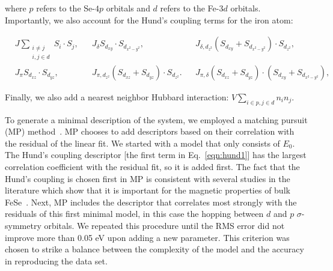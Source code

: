 where $p$ refers to the Se-$4p$ orbitals and $d$ refers to the Fe-$3d$ orbitals. 
Importantly, we also account for the Hund's coupling terms for the iron atom:

\begin{align}
  &J \sum_{\substack{i\ne j \\i,j \in d}} S_i \cdot S_j,&
  &J_{\delta} S_{d_{xy}} \cdot S_{d_{x^2-y^2}},&
  &J_{\delta,d_{z^2}} (S_{d_{xy}} + S_{d_{x^2-y^2}}) \cdot S_{d_{z^2}},& \label{eqn:hund1}
  \nonumber \\
  &J_{\pi} S_{d_{xz}} \cdot S_{d_{yz}},&
  &J_{\pi,d_{z^2}} (S_{d_{xz}} + S_{d_{yz}}) \cdot S_{d_{z^2}}.&
  &J_{\pi,\delta} (S_{d_{xz}} + S_{d_{yz}}) \cdot (S_{d_{xy}} + S_{d_{x^2-y^2}}),&
\end{align}

Finally, we also add a nearest neighbor Hubbard interaction: $V \sum_{i\in p, j\in d} n_{i} n_j$.

To generate a minimal description of the system, we employed a matching pursuit (MP) method~\cite{MP_Zhang1993}.
MP chooses to add descriptors based on their correlation with the residual of the linear fit. 
We started with a model that only consists of $E_0$. The Hund's coupling descriptor [the first term in Eq.~\eqref{eqn:hund1}]
has the largest correlation coefficient with the residual fit, so it is added first. The fact that the Hund's coupling is chosen first in MP 
is consistent with several studies in the literature which show that it is important for the magnetic properties of bulk FeSe~\cite{demedici_hunds_2011,de_medici_janus-faced_2011,georges_strong_2013,busemeyer_competing_2016}. 
Next, MP includes the descriptor that correlates most strongly with the residuals of this first minimal model, in this case the hopping between $d$ and $p$ $\sigma$-symmetry orbitals. 
We repeated this procedure until the RMS error did not improve more than 0.05 eV upon adding a new parameter.
This criterion was chosen to strike a balance between the complexity of the model and the accuracy in reproducing the data set.

